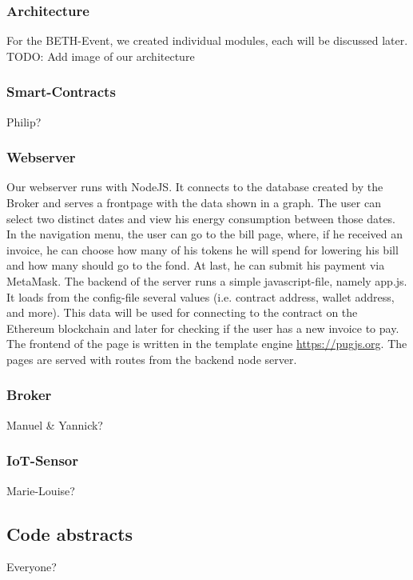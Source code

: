 \subsubsection{Architecture}
For the BETH-Event, we created individual modules, each will be discussed later.
TODO: Add image of our architecture
\subsubsection{Smart-Contracts}
Philip?

\subsubsection{Webserver}
Our webserver runs  with NodeJS. It connects to the database created by the Broker and serves a frontpage with the data shown in a graph. The user can select two distinct dates and view his energy consumption between those dates. In the navigation menu, the user can go to the bill page, where, if he received an invoice, he can choose how many of his tokens he will spend for lowering his bill and how many should go to the fond. At last, he can submit his payment via MetaMask. The backend of the server runs a simple javascript-file, namely app.js. It loads from the config-file several values (i.e. contract address, wallet address, and more). This data will be used for connecting to the contract on the Ethereum blockchain and later for checking if the user has a new invoice to pay. The frontend of the page is written in the template engine \hyperref[PugJS]{https://pugjs.org}. The pages are served with routes from the backend node server.

\subsubsection{Broker}
Manuel & Yannick?

\subsubsection{IoT-Sensor}
Marie-Louise?

\subsection{Code abstracts}
Everyone?
